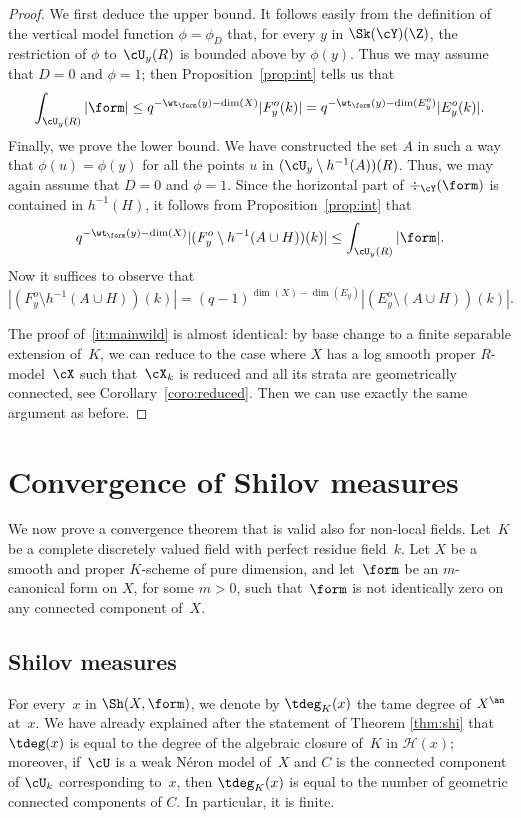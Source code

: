 \begin{proof}
We first deduce the upper bound. It follows easily from the definition of the vertical model function $\phi=\phi_D$ that,
for every $y$ in $\Sk(\cY)(\Z)$, the restriction of $\phi$ to~$\cU_y(R)$ is bounded above by $\phi(y)$.
Thus we may assume that $D=0$ and $\phi=1$; then Proposition~\ref{prop:int} tells us that
\[
\int_{\cU_y(R)}|\form|\leq q^{-\wt_{\form}(y)-\dim(X)}|F^o_y(k)|= q^{-\wt_{\form}(y)-\dim(E^o_y)}|E^o_y(k)|.
\]
Finally, we prove the lower bound. We have constructed the set $A$ in such a way that $\phi(u)=\phi(y)$ for all the points
$u$ in $(\cU_y\setminus h^{-1}(A))(R)$. Thus, we may again assume that $D=0$ and $\phi=1$. Since the horizontal part of $\div_{\cY}(\form)$ is contained in $h^{-1}(H)$, it follows from Proposition~\ref{prop:int} that
\[
q^{-\wt_{\form}(y)-\dim(X)}|(F_y^o\setminus h^{-1}(A\cup H))(k)| \leq \int_{\cU_y(R)}|\form|.
\]
Now it suffices to observe that
\[
|(F_y^o\setminus h^{-1}(A\cup H))(k)|=(q-1)^{\dim(X)-\dim(E_y)}|(E_y^o\setminus (A\cup H))(k)|.
\]

The proof of~\eqref{it:mainwild} is almost identical: by base change to a finite separable extension of~$K$, we can reduce to the case where $X$ has a log smooth proper $R$\nobreakdash-model~$\cX$ such that~$\cX_k$ is reduced and all its strata are geometrically connected, see Corollary~\ref{coro:reduced}. Then we can use exactly the same argument as before.
\end{proof}

\section{Convergence of Shilov measures}\label{sec:convshilov}
We now prove a convergence theorem that is valid also for non-local fields.
Let~$K$ be a complete discretely valued field with perfect residue field~$k$.
Let $X$ be a smooth and proper $K$\nobreakdash-scheme of pure dimension, and let~$\form$ be an $m$-canonical form on $X$, for some $m>0$, such that~$\form$ is not identically zero on any connected component of~$X$.

\subsection{Shilov measures}\label{ss:shimeas}
For every~$x$ in $\Sh(X,\form)$, we denote by $\tdeg_K(x)$ the tame degree of $X^{\an}$ at~$x$.
We have already explained after the statement of Theorem \ref{thm:shi} that $\tdeg(x)$ is equal to the degree of the algebraic closure of~$K$ in $\mathscr{H}(x)$; moreover,
if~$\cU$ is a weak Néron model of~$X$ and $C$ is the connected component of $\cU_k$ corresponding to~$x$, then $\tdeg_K(x)$ is equal to the number of geometric connected components of $C$. In particular, it is finite.

